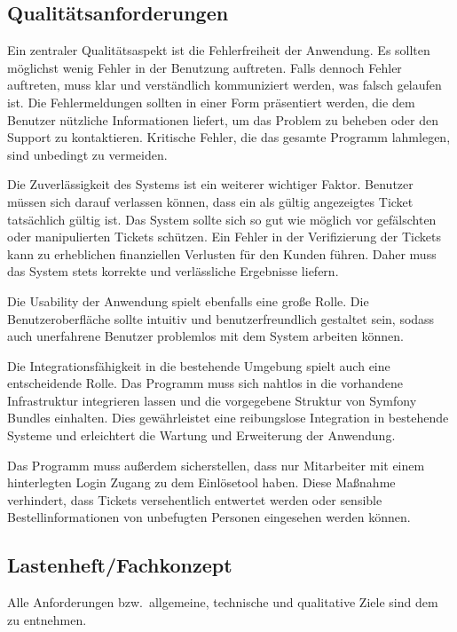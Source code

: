 \subsection{Qualitätsanforderungen}
\label{sec:Qualitaetsanforderungen}

Ein zentraler Qualitätsaspekt ist die Fehlerfreiheit der Anwendung. Es sollten möglichst wenig Fehler in der Benutzung auftreten. Falls dennoch Fehler auftreten, muss klar und verständlich kommuniziert werden, was falsch gelaufen ist. Die Fehlermeldungen sollten in einer Form präsentiert werden, die dem Benutzer nützliche Informationen liefert, um das Problem zu beheben oder den Support zu kontaktieren. Kritische Fehler, die das gesamte Programm lahmlegen, sind unbedingt zu vermeiden.

Die Zuverlässigkeit des Systems ist ein weiterer wichtiger Faktor. Benutzer müssen sich darauf verlassen können, dass ein als gültig angezeigtes Ticket tatsächlich gültig ist. Das System sollte sich so gut wie möglich vor gefälschten oder manipulierten Tickets schützen. Ein Fehler in der Verifizierung der Tickets kann zu erheblichen finanziellen Verlusten für den Kunden führen. Daher muss das System stets korrekte und verlässliche Ergebnisse liefern.

Die Usability der Anwendung spielt ebenfalls eine große Rolle. Die Benutzeroberfläche sollte intuitiv und benutzerfreundlich gestaltet sein, sodass auch unerfahrene Benutzer problemlos mit dem System arbeiten können.

Die Integrationsfähigkeit in die bestehende Umgebung spielt auch eine entscheidende Rolle. Das Programm muss sich nahtlos in die vorhandene Infrastruktur integrieren lassen und die vorgegebene Struktur von Symfony Bundles einhalten. Dies gewährleistet eine reibungslose Integration in bestehende Systeme und erleichtert die Wartung und Erweiterung der Anwendung.

Das Programm muss außerdem sicherstellen, dass nur Mitarbeiter mit einem hinterlegten Login Zugang zu dem Einlösetool haben. Diese Maßnahme verhindert, dass Tickets versehentlich entwertet werden oder sensible Bestellinformationen von unbefugten Personen eingesehen werden können.

\subsection{Lastenheft/Fachkonzept}
\label{sec:Lastenheft}
Alle Anforderungen bzw.\ allgemeine, technische und qualitative Ziele sind dem  zu entnehmen.
